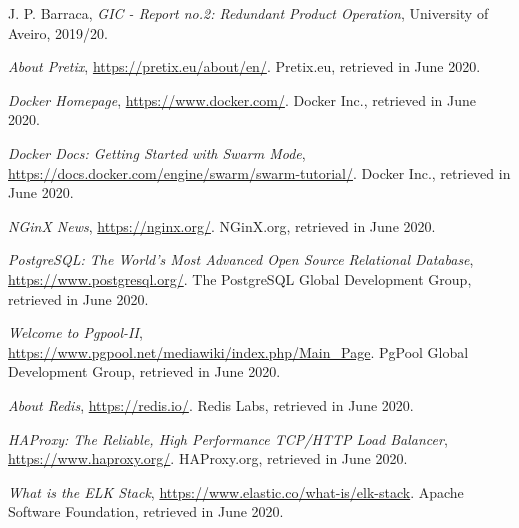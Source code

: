 \documentclass[12pt]{article}
\begin{document}
\newpage
\begin{thebibliography}{9} %
  

    J. P. Barraca,
    \textit{GIC - Report no.2: Redundant Product Operation},
    University of Aveiro,
    2019/20.
    \vspace{-10pt}

    \textit{About Pretix},
    \url{https://pretix.eu/about/en/}.
    Pretix.eu,
    retrieved in June 2020.
    \vspace{-10pt}

    \textit{Docker Homepage},
    \url{https://www.docker.com/}.
    Docker Inc.,
    retrieved in June 2020.
    \vspace{-10pt}

    \textit{Docker Docs: Getting Started with Swarm Mode},
    \url{https://docs.docker.com/engine/swarm/swarm-tutorial/}.
    Docker Inc.,
    retrieved in June 2020.
    \vspace{-10pt}

    \textit{NGinX News},
    \url{https://nginx.org/}.
    NGinX.org,
    retrieved in June 2020.
    \vspace{-10pt}

    \textit{PostgreSQL: The World's Most Advanced Open Source Relational Database},
    \url{https://www.postgresql.org/}.
    The PostgreSQL Global Development Group,
    retrieved in June 2020.
    \vspace{-10pt}

    \textit{Welcome to Pgpool-II},
    \url{https://www.pgpool.net/mediawiki/index.php/Main_Page}.
    PgPool Global Development Group,
    retrieved in June 2020.
    \vspace{-10pt}

    \textit{About Redis},
    \url{https://redis.io/}.
    Redis Labs,
    retrieved in June 2020.
    \vspace{-10pt}

    \textit{HAProxy: The Reliable, High Performance TCP/HTTP Load Balancer},
    \url{https://www.haproxy.org/}.
    HAProxy.org,
    retrieved in June 2020.
    \vspace{-10pt}

    \textit{What is the ELK Stack},
    \url{https://www.elastic.co/what-is/elk-stack}.
    Apache Software Foundation,
    retrieved in June 2020.
    \vspace{-10pt}


\end{thebibliography}
\end{document}
